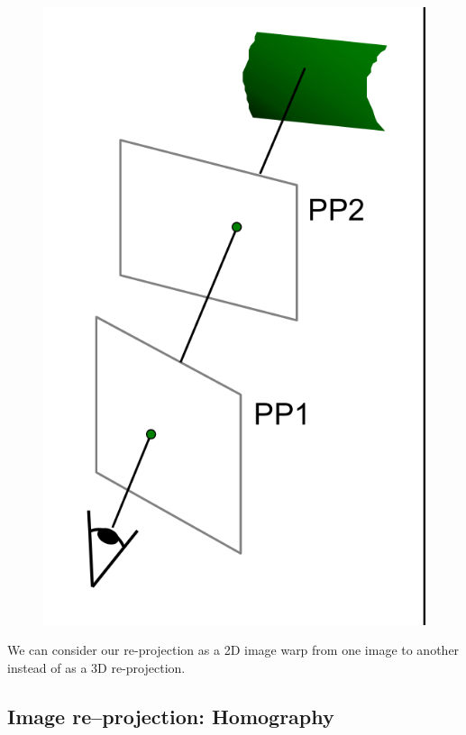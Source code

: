 \documentclass{article}
\begin{document}
\begin{figure}[ht]
  \centering
  \includegraphics[scale=0.4]{figures/l5-2.png}
  \caption{\label{fig:raytrace} }
\end{figure}



We can consider our re-projection as a 2D image warp from one image to another instead of as a 3D re-projection.


\subsection{Image re--projection: Homography}
\end{document}
